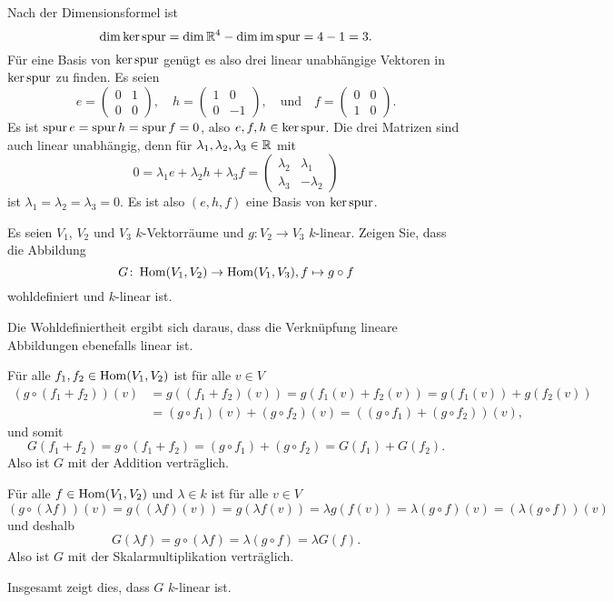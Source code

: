 \begin{solution}
\begin{enumerate}
   Nach der Dimensionsformel ist
   \[
    \dim \ker \operatorname{spur} = \dim \mathbb{R}^4 - \dim \operatorname{im} \operatorname{spur} = 4 - 1 = 3.
   \]
   Für eine Basis von $\ker \operatorname{spur}$ genügt es also drei linear unabhängige Vektoren in $\ker \operatorname{spur}$ zu finden. Es seien
   \[
    e = \begin{pmatrix} 0 & 1 \\ 0 & 0 \end{pmatrix}, \quad
    h = \begin{pmatrix} 1 & 0 \\ 0 & -1 \end{pmatrix}, \quad
    \text{und} \quad
    f = \begin{pmatrix} 0 & 0 \\ 1 & 0 \end{pmatrix}.
   \]
   Es ist $\operatorname{spur} e = \operatorname{spur} h = \operatorname{spur} f = 0$, also $e, f, h \in \ker \operatorname{spur}$. Die drei Matrizen sind auch linear unabhängig, denn für $\lambda_1, \lambda_2, \lambda_3 \in \mathbb{R}$ mit
   \[
    0
    = \lambda_1 e + \lambda_2 h + \lambda_3 f
    =
    \begin{pmatrix}
     \lambda_2 &  \lambda_1 \\
     \lambda_3 & -\lambda_2
    \end{pmatrix}
   \]
   ist $\lambda_1 = \lambda_2 = \lambda_3 = 0$. Es ist also $(e,h,f)$ eine Basis von $\ker \operatorname{spur}$.
 \end{enumerate}
\end{solution}


\begin{question}
 Es seien $V_1$, $V_2$ und $V_3$ $k$-Vektorräume und $g \colon V_2 \to V_3$ $k$-linear. Zeigen Sie, dass die Abbildung
 \[
  G \colon \operatorname{Hom}(V_1, V_2) \to \operatorname{Hom}(V_1, V_3), f \mapsto g \circ f
 \]
 wohldefiniert und $k$-linear ist.
\end{question}
\begin{solution}
 Die Wohldefiniertheit ergibt sich daraus, dass die Verknüpfung lineare Abbildungen ebenefalls linear ist.
 
 Für alle $f_1, f_2 \in \operatorname{Hom}(V_1, V_2)$ ist für alle $v \in V$
 \begin{align*}
  (g \circ (f_1 + f_2))(v)
  &= g( (f_1 + f_2)(v) )
  = g( f_1(v) + f_2(v) )
  = g(f_1(v)) + g(f_2(v)) \\
  &= (g \circ f_1)(v) + (g \circ f_2)(v)
  = ((g \circ f_1) + (g \circ f_2))(v),
 \end{align*}
 und somit
 \[
  G(f_1 + f_2) = g \circ (f_1 + f_2) = (g \circ f_1) + (g \circ f_2) = G(f_1) + G(f_2).
 \]
 Also ist $G$ mit der Addition verträglich.
 
 Für alle $f \in \operatorname{Hom}(V_1, V_2)$ und $\lambda \in k$ ist für alle $v \in V$
 \[
  (g \circ (\lambda f))(v)
  = g((\lambda f)(v))
  = g(\lambda f(v))
  = \lambda g(f(v))
  = \lambda (g \circ f)(v)
  = (\lambda (g \circ f))(v)
 \]
 und deshalb
 \[
  G(\lambda f) = g \circ (\lambda f) = \lambda (g \circ f) = \lambda G(f).
 \]
 Also ist $G$ mit der Skalarmultiplikation verträglich.
 
 Insgesamt zeigt dies, dass $G$ $k$-linear ist.
\end{solution}


